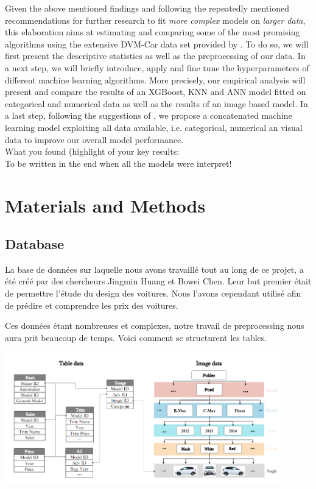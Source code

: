 \documentclass[12pt]{article}
\begin{document}
\noindent Given the above mentioned findings and following the repeatedly mentioned recommendations for further research to fit \textit{more complex} models on \textit{larger data}, this elaboration aims at estimating and comparing some of the most promising algorithms using the extensive DVM-Car data set provided by \cite{huang2023dvmcar}. To do so, we will first present the descriptive statistics as well as the preprocessing of our data. In a next step, we will briefly introduce, apply and fine tune the hyperparameters of different machine learning algorithms. More precisely, our empirical analysis will present and compare the results of an XGBoost, KNN and ANN model fitted on categorical and numerical data as well as the results of an image based model. In a last step, following the suggestions of \cite{Pudaruth2014}, we propose a concatenated machine learning model exploiting all data available, i.e. categorical, numerical an visual data to improve our overall model performance.\\

\noindent What you found (highlight of your key results: \\
\noindent To be written in the end when all the models were interpret!



\section{Materials and Methods}
\subsection{Database}
\noindent La base de données sur laquelle nous avons travaillé tout au long de ce projet, a été créé par des chercheurs Jingmin Huang et Bowei Chen. Leur but premier était de permettre l'étude du design des voitures. Nous l'avons cependant utilisé afin de prédire et comprendre les prix des voitures. 

\noindent Ces données étant nombreuses et complexes, notre travail de preprocessing nous aura prit beaucoup de temps. Voici comment se structurent les tables. 

\includegraphics[width=0.9\textwidth]{general_data_tables.png}\\
\vspace{0.5cm}
\end{document}
